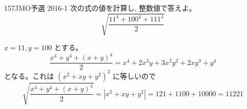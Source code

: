 \begin{prob}{157}{}{JMO予選 2016-1}
 次の式の値を計算し, 整数値で答えよ。\\
 \[ \sqrt{\dfrac{11^4+100^4+111^4}{2}} \]
\end{prob}
$x=11, y=100$ とする。
\[\dfrac{x^4+y^4+(x+y)^4}{2}=x^4+2x^3y+3x^2y^2+2xy^3+y^4\]
となる。これは $(x^2+xy+y^2)^2$ に等しいので
\[\sqrt{\dfrac{x^4+y^4+(x+y)^4}{2}}=|x^2+xy+y^2|=121+1100+10000=11221\]
